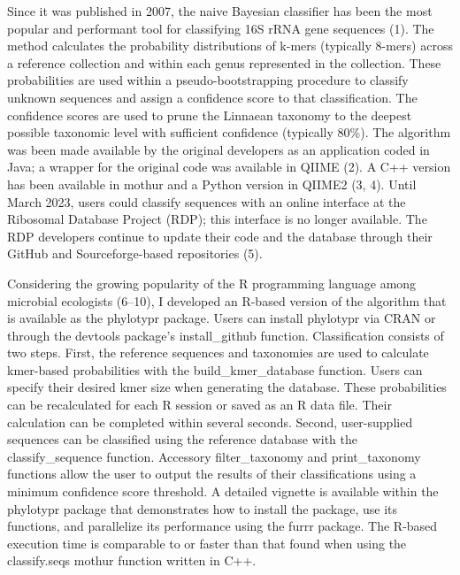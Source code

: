 \documentclass[
  11pt,
]{article}
\begin{document}
Since it was published in 2007, the naive Bayesian classifier has been
the most popular and performant tool for classifying 16S rRNA gene
sequences (1). The method calculates the probability distributions of
k-mers (typically 8-mers) across a reference collection and within each
genus represented in the collection. These probabilities are used within
a pseudo-bootstrapping procedure to classify unknown sequences and
assign a confidence score to that classification. The confidence scores
are used to prune the Linnaean taxonomy to the deepest possible
taxonomic level with sufficient confidence (typically 80\%). The
algorithm was been made available by the original developers as an
application coded in Java; a wrapper for the original code was available
in QIIME (2). A C++ version has been available in mothur and a Python
version in QIIME2 (3, 4). Until March 2023, users could classify
sequences with an online interface at the Ribosomal Database Project
(RDP); this interface is no longer available. The RDP developers
continue to update their code and the database through their GitHub and
Sourceforge-based repositories (5).

Considering the growing popularity of the R programming language among
microbial ecologists (6--10), I developed an R-based version of the
algorithm that is available as the phylotypr package. Users can install
phylotypr via CRAN or through the devtools package's install\_github
function. Classification consists of two steps. First, the reference
sequences and taxonomies are used to calculate kmer-based probabilities
with the build\_kmer\_database function. Users can specify their desired
kmer size when generating the database. These probabilities can be
recalculated for each R session or saved as an R data file. Their
calculation can be completed within several seconds. Second,
user-supplied sequences can be classified using the reference database
with the classify\_sequence function. Accessory filter\_taxonomy and
print\_taxonomy functions allow the user to output the results of their
classifications using a minimum confidence score threshold. A detailed
vignette is available within the phylotypr package that demonstrates how
to install the package, use its functions, and parallelize its
performance using the furrr package. The R-based execution time is
comparable to or faster than that found when using the classify.seqs
mothur function written in C++.
\end{document}
